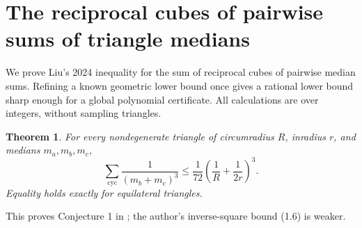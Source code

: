 \documentclass[11pt,a4paper]{article}
\numberwithin{equation}{section}
\newtheorem{theorem}{Theorem}[section]
\theoremstyle{definition}
\theoremstyle{remark}
\newenvironment{sectionabstract}{\par\smallskip\begingroup\small\noindent}{\par\endgroup\medskip}
\begin{document}
\par\endgroup

\begingroup

\section{\texorpdfstring{The reciprocal cubes of pairwise sums of triangle medians}{The reciprocal cubes of pairwise sums of triangle medians}}\label{section:r36reiwa}
\par\medskip


\begin{sectionabstract}
We prove Liu's 2024 inequality for the sum of reciprocal cubes of pairwise median sums. Refining a known geometric lower bound once gives a rational lower bound sharp enough for a global polynomial certificate. All calculations are over integers, without sampling triangles.
\end{sectionabstract}
\begin{theorem}
For every nondegenerate triangle of circumradius $R$, inradius $r$, and medians $m_a,m_b,m_c$,
\[
\sum_{\mathrm{cyc}}\frac1{(m_b+m_c)^3}
\le \frac1{72}\left(\frac1R+\frac1{2r}\right)^3 .
\]
Equality holds exactly for equilateral triangles.
\end{theorem}
\noindent This proves Conjecture 1 in \cite[Eq.~(5.1)]{r36reiwa:liu}; the author's inverse-square bound (1.6) is weaker.
\end{document}
